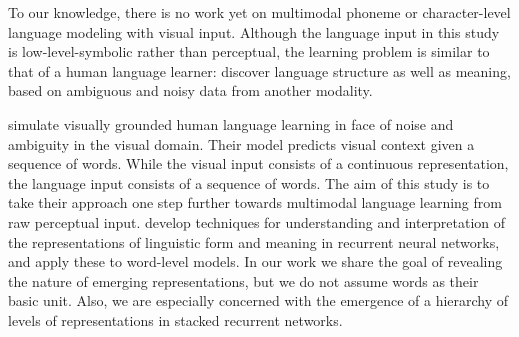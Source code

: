 To our knowledge, there is no work yet on multimodal phoneme or character-level language modeling with visual input. %
Although the language input in this study is low-level-symbolic rather
than perceptual, the learning problem is similar to that of a human language learner: discover language structure as well as meaning, based on ambiguous and noisy data from another modality. 

 simulate visually grounded human
language learning in face of noise and ambiguity in the visual
domain. Their model predicts visual context given a sequence of words. While the visual input consists of a continuous representation, the language input consists of a sequence of words. The aim of this study is to take their approach one step further towards multimodal language learning from raw perceptual input. 
 develop techniques for understanding
and interpretation of the representations of linguistic form and
meaning in recurrent neural networks, and apply these to word-level
models. In our work we share the goal of revealing the nature of
emerging representations, but we do not assume words as their basic
unit. Also, we are especially concerned with the emergence of a
hierarchy of levels of representations in stacked recurrent networks. 